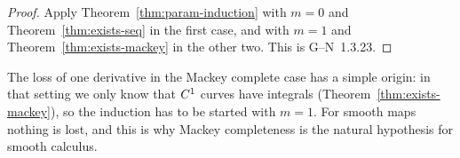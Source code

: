 \begin{proof}
  \leanok
  Apply Theorem~\ref{thm:param-induction} with $m = 0$ and Theorem~\ref{thm:exists-seq} in the
  first case, and with $m = 1$ and Theorem~\ref{thm:exists-mackey} in the other two. This is
  G--N~1.3.23.
\end{proof}

\begin{remark}
  The loss of one derivative in the Mackey complete case has a simple origin: in that setting
  we only know that $C^{1}$ curves have integrals (Theorem~\ref{thm:exists-mackey}), so the
  induction has to be started with $m = 1$. For smooth maps nothing is lost, and this is why
  Mackey completeness is the natural hypothesis for smooth calculus.
\end{remark}
